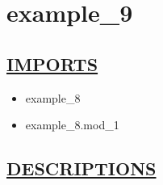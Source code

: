 \chapter*{example\_9}

\section*{\underline{IMPORTS}}
\begin{itemize}
\item example\_8
\item example\_8.mod\_1
\end{itemize}

\section*{\underline{DESCRIPTIONS}}
